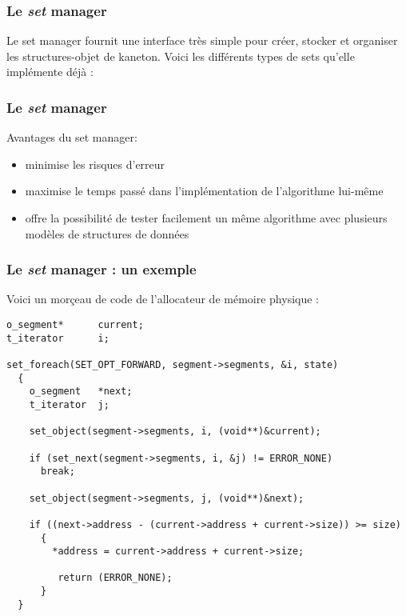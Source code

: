 
\begin{frame}
  \frametitle{Le \emph{set} manager}

  Le set manager fournit une interface tr\`es simple pour cr\'eer, stocker et
  organiser les structures-objet de kaneton. Voici les diff\'erents types de
  sets qu'elle impl\'emente d\'ej\`a :

  \-

  \begin{center}
  \end{center}

\end{frame}


\begin{frame}
  \frametitle{Le \emph{set} manager}

  Avantages du set manager:

  \begin{itemize}
    \item
    minimise les risques d'erreur
    \item
    maximise le temps pass\'e dans l'impl\'ementation de l'algorithme
    lui-m\^eme
    \item
    offre la possibilit\'e de tester facilement un m\^eme algorithme avec
    plusieurs mod\`eles de structures de donn\'ees
  \end{itemize}

\end{frame}


\begin{frame}[containsverbatim]
  \frametitle{Le \emph{set} manager : un exemple}

  Voici un mor\c{c}eau de code de l'allocateur de m\'{e}moire physique :

  \begin{verbatim}
o_segment*      current;
t_iterator      i;

set_foreach(SET_OPT_FORWARD, segment->segments, &i, state)
  {
    o_segment   *next;
    t_iterator  j;

    set_object(segment->segments, i, (void**)&current);

    if (set_next(segment->segments, i, &j) != ERROR_NONE)
      break;

    set_object(segment->segments, j, (void**)&next);

    if ((next->address - (current->address + current->size)) >= size)
      {
        *address = current->address + current->size;

         return (ERROR_NONE);
      }
  }
  \end{verbatim}

\end{frame}

